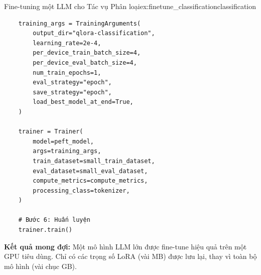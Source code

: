 \begin{example}{Fine-tuning một LLM cho Tác vụ Phân loại}{ex:finetune_classificationclassification}
\begin{verbatim}
    training_args = TrainingArguments(
        output_dir="qlora-classification",
        learning_rate=2e-4,
        per_device_train_batch_size=4,
        per_device_eval_batch_size=4,
        num_train_epochs=1,
        eval_strategy="epoch",
        save_strategy="epoch",
        load_best_model_at_end=True,
    )
    
    trainer = Trainer(
        model=peft_model,
        args=training_args,
        train_dataset=small_train_dataset,
        eval_dataset=small_eval_dataset,
        compute_metrics=compute_metrics,
        processing_class=tokenizer,
    )
    
    # Bước 6: Huấn luyện
    trainer.train()
    \end{verbatim}
\end{example}
\textbf{Kết quả mong đợi:} Một mô hình LLM lớn được fine-tune hiệu quả trên một GPU tiêu dùng. Chỉ có các trọng số LoRA (vài MB) được lưu lại, thay vì toàn bộ mô hình (vài chục GB).
